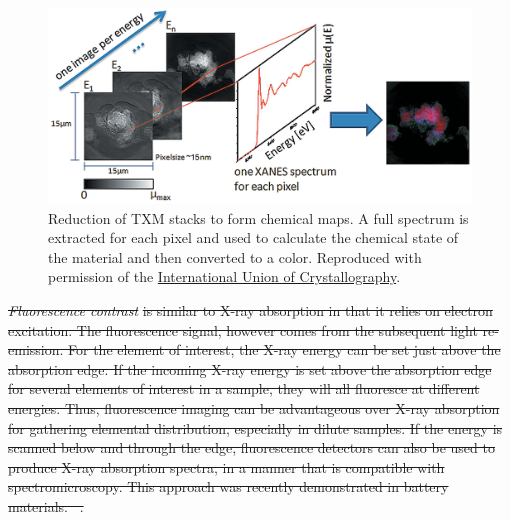 \documentclass[journal=cmatex,manuscript=perspective]{achemso}
\newcommand{\iucr}{Reproduced with permission of the
  \href{http://journals.iucr.org/}{International Union of
    Crystallography}.}
\providecommand{\DIFdeltex}[1]{{\protect\color{red}\sout{#1}}}                      %
\providecommand{\DIFdelbegin}{} %
\providecommand{\DIFdel}[1]{\texorpdfstring{\DIFdeltex{#1}}{}} %
\begin{document}
\begin{figure}
  \includegraphics[width=\textwidth]{meirer2011-2.png}
  \caption{Reduction of TXM stacks to form chemical maps. A full
    spectrum is extracted for each pixel and used to calculate the
    chemical state of the material and then converted to a
    color.\cite{meirer2011} \iucr}
  \label{figure:meirer2011-2}
\end{figure}

\DIFdelbegin \emph{\DIFdel{Fluorescence contrast}} %
\DIFdel{is similar to X-ray absorption in that it relies
on electron excitation. The fluorescence signal, however comes from
the subsequent light re-emission. For the element of interest, the
X-ray energy can be set just above the absorption edge. If the
incoming X-ray energy is set above the absorption edge for several
elements of interest in a sample, they will all fluoresce at different
energies. Thus, fluorescence imaging can be advantageous over X-ray
absorption for gathering elemental distribution, especially in dilute
samples. If the energy is scanned below and through the edge,
fluorescence detectors can also be used to produce X-ray absorption
spectra, in a manner that is compatible with spectromicroscopy. This
approach was recently demonstrated in battery
materials.\mbox{%
\cite{chueh2015}}%
.
}%
\end{document}
